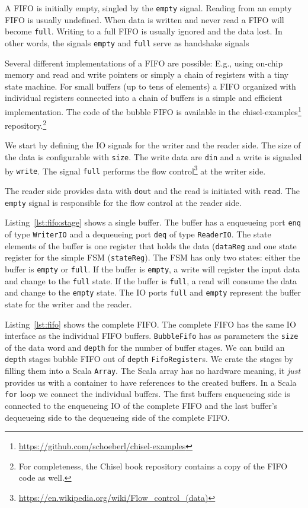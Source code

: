 \documentclass[%
    10pt,
    headinclude, footexclude,
    openright, %
    notitlepage,
    cleardoubleempty,
    headsepline,
    pointlessnumbers,
    bibtotoc, idxtotoc,
    ]{scrbook}
\newcommand{\code}[1]{{\small{\texttt{#1}}}}
\newcommand{\myref}[2]{\href{#1}{#2}}
\renewcommand{\myref}[2]{{#2}{\footnote{\url{#1}}}}
\begin{document}
A FIFO is initially empty, singled by the \code{empty} signal. Reading
from an empty FIFO is usually undefined. When data is written and never
read a FIFO will become \code{full}. Writing to a full FIFO is usually ignored
and the data lost. In other words, the signals \code{empty} and \code{full}
serve as handshake signals 

Several different implementations of a FIFO are possible: E.g., using on-chip
memory and read and write pointers or simply a chain of registers with a
tiny state machine. For small buffers (up to tens of elements) a FIFO organized
with individual registers connected into a chain of buffers is a simple and efficient
implementation.
The code of the bubble FIFO is available in the
\myref{https://github.com/schoeberl/chisel-examples}{chisel-examples}
repository.\footnote{For completeness, the Chisel book repository contains
a copy of the FIFO code as well.}

We start by defining the IO signals for the writer and the reader side.
The size of the data is configurable with \code{size}.
The write data are \code{din} and a write is signaled by \code{write}.
The signal \code{full} performs the
\myref{https://en.wikipedia.org/wiki/Flow_control_(data)}{flow control}
at the writer side.


The reader side provides data with \code{dout} and the read is initiated
with \code{read}. The \code{empty} signal is responsible for the flow control
at the reader side.


Listing~\ref{lst:fifo:stage} shows a single buffer. The buffer has a enqueueing port
\code{enq} of type \code{WriterIO} and a dequeueing port \code{deq} of type
\code{ReaderIO}. The state elements of the buffer is one register that holds the
data (\code{dataReg} and one state register for the simple FSM (\code{stateReg}).
The FSM has only two states: either the buffer is \code{empty} or \code{full}.
If the buffer is \code{empty}, a write will register the input data and change
to the \code{full} state.
If the buffer is \code{full}, a read will consume the data and change to the
\code{empty} state.
The IO ports \code{full} and \code{empty} represent the buffer state for
the writer and the reader.


Listing~\ref{lst:fifo} shows the complete FIFO. The complete FIFO has
the same IO interface as the individual FIFO buffers.
\code{BubbleFifo} has as parameters the \code{size} of the data
word and \code{depth} for the number of buffer stages.
We can build an \code{depth} stages bubble FIFO out of \code{depth}
\code{FifoRegister}s. We crate the stages by filling them into a Scala \code{Array}.
The Scala array has no hardware meaning, it \emph{just} provides us with
a container to have references to the created buffers.
In a Scala \code{for} loop we connect the individual buffers.
The first buffers enqueueing side is connected to the enqueueing IO of
the complete FIFO and the last buffer's dequeueing side to the
dequeueing side of the complete FIFO.
\end{document}
